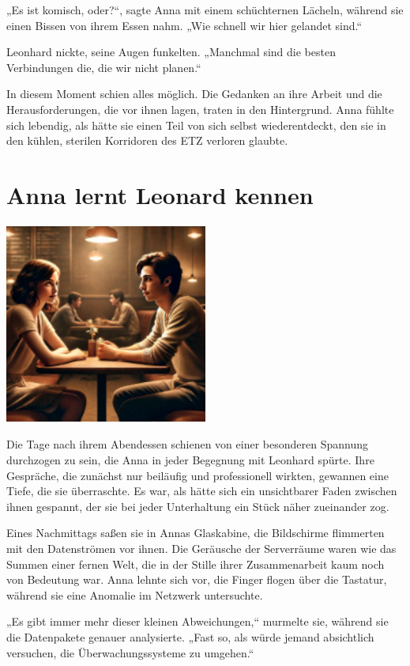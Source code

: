 \documentclass[
]{article}
\begin{document}
„Es ist komisch, oder?{\kern0pt}``, sagte Anna mit einem schüchternen
Lächeln, während sie einen Bissen von ihrem Essen nahm. „Wie schnell wir
hier gelandet sind.``

Leonhard nickte, seine Augen funkelten. „Manchmal sind die besten
Verbindungen die, die wir nicht planen.``

In diesem Moment schien alles möglich. Die Gedanken an ihre Arbeit und
die Herausforderungen, die vor ihnen lagen, traten in den Hintergrund.
Anna fühlte sich lebendig, als hätte sie einen Teil von sich selbst
wiederentdeckt, den sie in den kühlen, sterilen Korridoren des ETZ
verloren glaubte.

\section{Anna lernt Leonard kennen}\label{anna-lernt-leonard-kennen}

\includegraphics[width=2.625in,height=2.59375in]{media/image0003.png}

Die Tage nach ihrem Abendessen schienen von einer besonderen Spannung
durchzogen zu sein, die Anna in jeder Begegnung mit Leonhard spürte.
Ihre Gespräche, die zunächst nur beiläufig und professionell wirkten,
gewannen eine Tiefe, die sie überraschte. Es war, als hätte sich ein
unsichtbarer Faden zwischen ihnen gespannt, der sie bei jeder
Unterhaltung ein Stück näher zueinander zog.

Eines Nachmittags saßen sie in Annas Glaskabine, die Bildschirme
flimmerten mit den Datenströmen vor ihnen. Die Geräusche der Serverräume
waren wie das Summen einer fernen Welt, die in der Stille ihrer
Zusammenarbeit kaum noch von Bedeutung war. Anna lehnte sich vor, die
Finger flogen über die Tastatur, während sie eine Anomalie im Netzwerk
untersuchte.

„Es gibt immer mehr dieser kleinen Abweichungen,`` murmelte sie, während
sie die Datenpakete genauer analysierte. „Fast so, als würde jemand
absichtlich versuchen, die Überwachungssysteme zu umgehen.``
\end{document}
